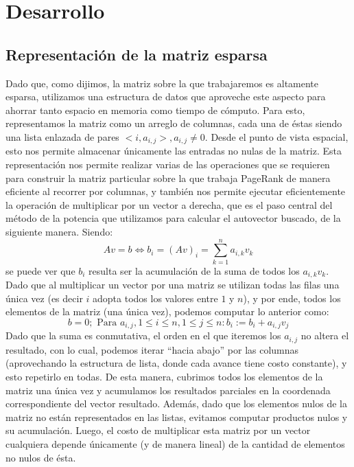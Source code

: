 \section{Desarrollo}
\subsection{Representación de la matriz esparsa}
Dado que, como dijimos, la matriz sobre la que trabajaremos es altamente esparsa, utilizamos una estructura de datos que aproveche este aspecto para ahorrar tanto espacio en memoria como tiempo de cómputo. Para esto, representamos la matriz como un arreglo de columnas, cada una de éstas siendo una lista enlazada de pares $<i, a_{i,j}>, a_{i,j} \neq 0$. Desde el punto de vista espacial, esto nos permite almacenar únicamente las entradas no nulas de la matriz. Esta representación nos permite realizar varias de las operaciones que se requieren para construir la matriz particular sobre la que trabaja PageRank de manera eficiente al recorrer por columnas, y también nos permite ejecutar eficientemente la operación de multiplicar por un vector a derecha, que es el paso central del método de la potencia que utilizamos para calcular el autovector buscado, de la siguiente manera. Siendo:
$$Av = b \Leftrightarrow b_i = (Av)_i = \displaystyle\sum_{k=1}^n a_{i,k}v_k$$
se puede ver que $b_i$ resulta ser la acumulación de la suma de todos los $a_{i,k} v_k$.
Dado que al multiplicar un vector por una matriz se utilizan todas las filas una única vez (es decir $i$ adopta todos los valores entre $1$ y $n$), y por ende, todos los elementos de la matriz (una única vez), podemos computar lo anterior como:
$$b = 0; \text{ Para } a_{i,j},  1\leq i\leq n, 1\leq j \leq n: b_i:= b_i + a_{i,j} v_j$$
Dado que la suma es conmutativa, el orden en el que iteremos los $a_{i,j}$ no altera el resultado, con lo cual, podemos iterar ``hacia abajo'' por las columnas (aprovechando la estructura de lista, donde cada avance tiene costo constante), y esto repetirlo en todas. De esta manera, cubrimos todos los elementos de la matriz una única vez y acumulamos los resultados parciales en la coordenada correspondiente del vector resultado. Además, dado que los elementos nulos de la matriz no están representados en las listas, evitamos computar productos nulos y su acumulación. Luego, el costo de multiplicar esta matriz por un vector cualquiera depende únicamente (y de manera lineal) de la cantidad de elementos no nulos de ésta.

